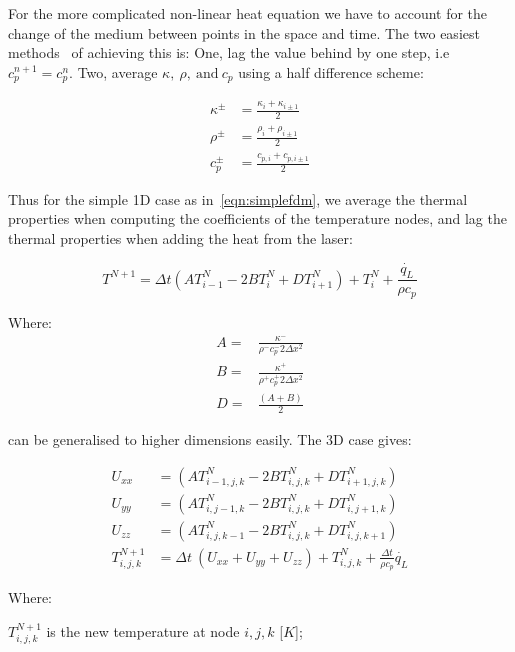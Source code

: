 \medskip

For the more complicated non-linear heat equation we have to account for the change of the medium between points in the space and time. The two easiest methods~\cite{ozisik1994finite} of achieving this is: One, lag the value behind by one step, i.e $c_{p}^{n+1}=c_{p}^{n}$. Two, average $\kappa,\ \rho,\ \text{and}\ c_p$ using a half difference scheme:

\begin{align}
\kappa^{\pm}&=\frac{\kappa_i+\kappa_{i\pm 1}}{2}\\
\rho^{\pm}&=\frac{\rho_i+\rho_{i\pm 1}}{2}\\
c_p^{\pm}&=\frac{c_{p,i}+c_{p,i\pm 1}}{2}
\end{align}

Thus for the simple 1D case as in~\cref{eqn:simplefdm}, we average the thermal properties when computing the coefficients of the temperature nodes, and lag the thermal properties when adding the heat from the laser:

\begin{equation}
T^{N+1}=\Delta t (AT^N_{i-1}-2BT^N_{i}+DT^N_{i+1})+ T_i^N + \frac{\dot{q_L}}{\rho c_p}\label{eqn:heatnonlin1d}
\end{equation}

Where:
\begin{align}
A=&\frac{\kappa^{-}}{\rho^{-}c_{p}^{-}2\Delta x^2} \nonumber \\
B=&\frac{\kappa^{+}}{\rho^{+}c_{p}^{+}2\Delta x^2} \label{eqn:coeffsABD}\\
D=&\frac{(A+B)}{2} \nonumber
\end{align}

 can be generalised to higher dimensions easily. The 3D case gives:

\begin{align}
U_{xx} &=  (A T^N_{i-1,j,k} - 2B T^N_{i,j,k} + D T^N_{i+1,j,k}) \label{eqn:FDMheat1}\\
U_{yy} &=  (A T^N_{i,j-1,k} - 2B T^N_{i,j,k} + D T^N_{i,j+1,k}) \label{eqn:FDMheat2}\\
U_{zz} &=  (A T^N_{i,j,k-1} - 2B T^N_{i,j,k} + D T^N_{i,j,k+1}) \label{eqn:FDMheat3}\\
T^{N+1}_{i,j,k} &= \Delta t\ (U_{xx} + U_{yy} + U_{zz}) + T^{N}_{i,j,k} + \tfrac{\Delta t}{\rho c_p}\dot{q_L} \label{eqn:FDMheat4}
\end{align}

\noindent Where:

	\indent $T^{N+1}_{i,j,k}$ is the new temperature at node $i,j,k$ [$K$];
	
